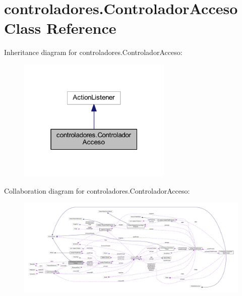 \hypertarget{classcontroladores_1_1_controlador_acceso}{}\section{controladores.\+Controlador\+Acceso Class Reference}
\label{classcontroladores_1_1_controlador_acceso}


Inheritance diagram for controladores.\+Controlador\+Acceso\+:\nopagebreak
\begin{figure}[H]
\begin{center}
\leavevmode
\includegraphics[width=208pt]{classcontroladores_1_1_controlador_acceso__inherit__graph}
\end{center}
\end{figure}


Collaboration diagram for controladores.\+Controlador\+Acceso\+:\nopagebreak
\begin{figure}[H]
\begin{center}
\leavevmode
\includegraphics[width=350pt]{classcontroladores_1_1_controlador_acceso__coll__graph}
\end{center}
\end{figure}
